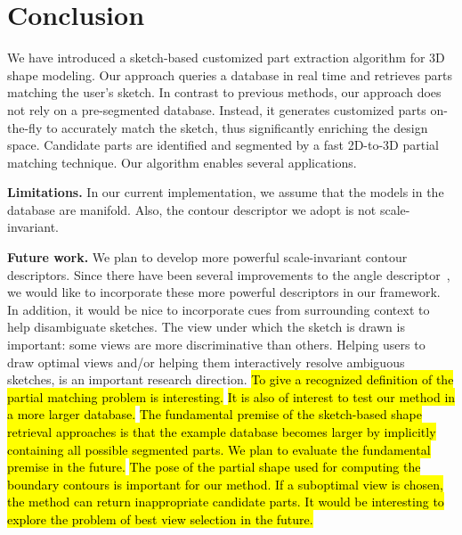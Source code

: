

\section{Conclusion}
We have introduced a sketch-based customized part extraction algorithm for 3D shape modeling. Our approach queries a database in real time and retrieves parts matching the user's sketch. In contrast to previous methods, our approach does not rely on a pre-segmented database. Instead, it generates customized parts on-the-fly to accurately match the sketch, thus significantly enriching the design space. Candidate parts are identified and segmented by a fast 2D-to-3D partial matching technique. Our algorithm enables several applications.

\textbf{Limitations.}  In our current implementation, we assume that the models in the database are manifold. Also, the contour descriptor we adopt is not scale-invariant.

\textbf{Future work.} We plan to develop more powerful scale-invariant contour descriptors. Since there have been several improvements to the angle descriptor~\cite{frompartialshapematchingcvpr}, we would like to incorporate these more powerful descriptors in our framework. In addition, it would be nice to incorporate cues from surrounding context to help disambiguate sketches. The view under which the sketch is drawn is important: some views are more discriminative than others. Helping users to draw optimal views and/or helping them interactively resolve ambiguous sketches, is an important research direction.
\hl{To give a recognized definition of the partial matching problem is interesting. }
\hl{It is also of interest to test our method in a more larger database. }
\hl{The fundamental premise of the sketch-based shape retrieval approaches is that the example database becomes larger by implicitly containing all possible segmented parts. We plan to evaluate the fundamental premise in the future. }
\hl{The pose of the partial shape used for computing the boundary contours is important for our method. 
If a suboptimal view is chosen, the method can return inappropriate candidate parts. 
It would be interesting to explore the problem of best view selection in the future. }